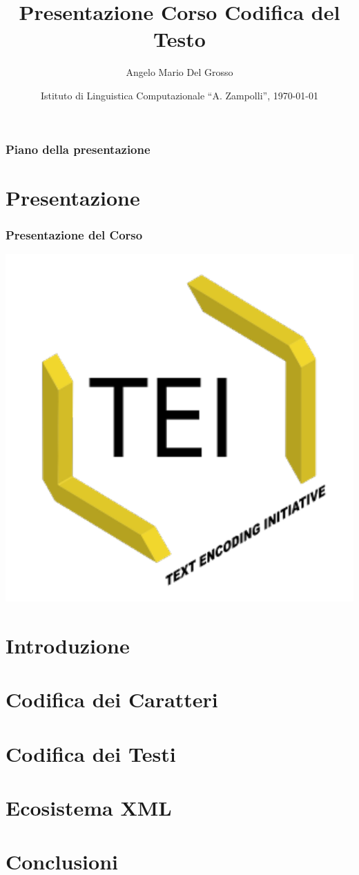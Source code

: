 \documentclass{beamer}
\title{Presentazione Corso Codifica del Testo}
\author[A.M. Del Grosso]{Angelo Mario Del Grosso}
\institute{\texttt{angelo.delgrosso@ilc.cnr.it} \\\bigskip\textit{CNR-ILC-LicoLab} \\\bigskip\url{http://licolab.ilc.cnr.it/}}
\date{Istituto di Linguistica Computazionale ``A. Zampolli'', \today}
\begin{document}
\begin{frame}
	\maketitle
\end{frame}

\begin{frame}
	\frametitle{Piano della presentazione}
	\tableofcontents
\end{frame}

\section{Presentazione}
\begin{frame}
	\frametitle{Presentazione del Corso}
	\addtocounter{nframe}{1}
    
    \begin{center}
	    \includegraphics[width=.5\textwidth]{../imgs/tei-r.pdf}
	\end{center}

    
\end{frame}

\section{Introduzione}
%

\section{Codifica dei Caratteri}
%

\section{Codifica dei Testi}
%

\section{Ecosistema XML}
%

\section{Conclusioni}
%
\end{document}
